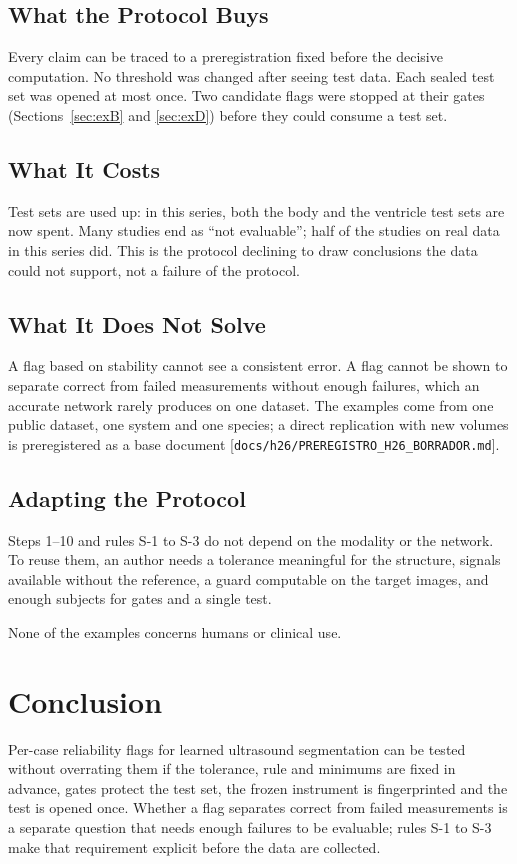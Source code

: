 \documentclass[journal,twoside]{IEEEtran}
\newcommand{\repo}[1]{[\nolinkurl{#1}]}   %
\begin{document}
\subsection{What the Protocol Buys}
Every claim can be traced to a preregistration fixed before the decisive computation. No threshold was changed after
seeing test data. Each sealed test set was opened at most once. Two candidate flags were stopped at their gates
(Sections~\ref{sec:exB} and \ref{sec:exD}) before they could consume a test set.

\subsection{What It Costs}
Test sets are used up: in this series, both the body and the ventricle test sets are now spent. Many studies end as
``not evaluable''; half of the studies on real data in this series did. This is the protocol declining to draw
conclusions the data could not support, not a failure of the protocol.

\subsection{What It Does Not Solve}
A flag based on stability cannot see a consistent error. A flag cannot be shown to separate correct from failed
measurements without enough failures, which an accurate network rarely produces on one dataset. The examples come
from one public dataset, one system and one species; a direct replication with new volumes is preregistered as a
base document \repo{docs/h26/PREREGISTRO_H26_BORRADOR.md}.

\subsection{Adapting the Protocol}
Steps 1--10 and rules S-1 to S-3 do not depend on the modality or the network. To reuse them, an author needs a
tolerance meaningful for the structure, signals available without the reference, a guard computable on the target
images, and enough subjects for gates and a single test.

None of the examples concerns humans or clinical use.

\section{Conclusion}
Per-case reliability flags for learned ultrasound segmentation can be tested without overrating them if the
tolerance, rule and minimums are fixed in advance, gates protect the test set, the frozen instrument is fingerprinted
and the test is opened once. Whether a flag separates correct from failed measurements is a separate question that
needs enough failures to be evaluable; rules S-1 to S-3 make that requirement explicit before the data are collected.
\end{document}
